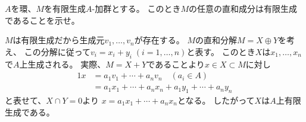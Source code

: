 \documentclass[report]{jlreq}
\begin{document}
\begin{problem}[代数学II 10.124]
    $A$を環、$M$を有限生成$A$-加群とする。
    このとき$M$の任意の直和成分は有限生成であることを示せ。
\end{problem}

\begin{answer}
    $M$は有限生成だから生成元$v_1, \dots, v_n$が存在する。
    $M$の直和分解$M = X \oplus Y$を考え、
    この分解に従って$v_i = x_i + y_i \; (i = 1, \dots, n)$と表す。
    このとき$X$は$x_1, \dots, x_n$で$A$上生成される。
    実際、$M = X + Y$であることより$x \in X \subset M$に対し
    \begin{alignat}{1}
        x &= a_1 v_1 + \cdots + a_n v_n
            \quad (a_i \in A) \\
          &= a_1 x_1 + \cdots + a_n x_n
            + a_1 y_1 + \cdots + a_n y_n
    \end{alignat}
    と表せて、$X \cap Y = 0$より
    $x = a_1 x_1 + \cdots + a_n x_n$となる。
    したがって$X$は$A$上有限生成である。
\end{answer}

\end{document}
